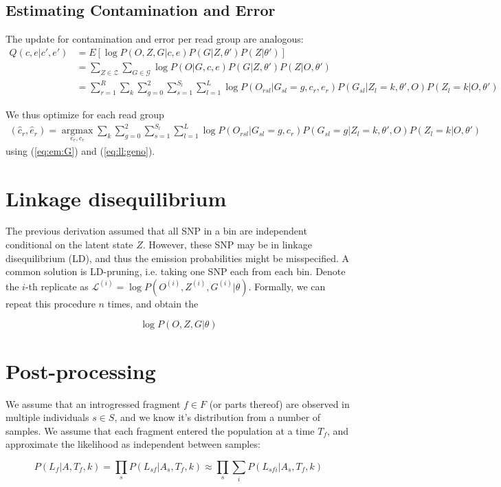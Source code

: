 \documentclass[10pt,a4paper]{article}
\begin{document}
\subsection{Estimating Contamination and Error}
The update for contamination and error per read group are analogous:
\begin{align}
Q(c, e|c', e' )&= E[\log P(O, Z, G|c, e )  P(G|Z, \theta') P(Z | \theta')]\nonumber\\
&=\sum_{Z \in \mathcal{Z}}\sum_{G \in \mathcal{G}} \log P( O | G, c, e) P(G|Z, \theta') P(Z | O, \theta')\nonumber\\
&=\sum_{r=1}^R\sum_k\sum_{g=0}^2 \sum_{s=1}^{S_l}\sum_{l=1}^L \log P(O_{rsl} | G_{sl}=g, c_r, e_r)  P(G_{sl}|Z_l=k, \theta', O) P(Z_l=k | O, \theta')
\end{align}

We thus optimize for each read group
\begin{align}
(\hat{c}_r, \hat{e}_r) = \operatorname*{argmax}_{e_r, c_r}\sum_k\sum_{g=0}^2 \sum_{s=1}^{S_l}\sum_{l=1}^L \log P(O_{rsl} | G_{sl}=g, c_r)  P(G_{sl}=g|Z_l=k, \theta', O) P(Z_l=k | O, \theta')
\end{align}
using (\ref{eq:em:G}) and (\ref{eq:ll:geno}).

\section{Linkage disequilibrium}
The previous derivation assumed that all SNP in a bin are independent conditional on the latent state $Z$. However, these SNP may be in linkage disequilibrium (LD), and thus the emission probabilities might be misspecified. A common solution is LD-pruning, i.e. taking one SNP each from each bin. Denote the $i$-th replicate as $\mathcal{L}^{(i)} = \log P(O^{(i)}, Z^{(i)}, G^{(i)} | \theta)$. Formally, we can repeat this procedure $n$ times, and obtain the 

$$
\log P(O, Z, G | \theta)
$$
\section{Post-processing}
We assume that an introgressed fragment $f \in F$ (or parts thereof) are observed in multiple individuals $s \in S$, and we know it's distribution from a number of samples. We assume that each fragment entered the population at a time $T_f$, and approximate the likelihood as independent between samples:

$$P(L_f | A, T_f, k) = \prod_s P(L_{sf} | A_s, T_f, k) \approx \prod_s \sum_i P(L_{sfi} | A_s, T_f, k)$$
\end{document}

